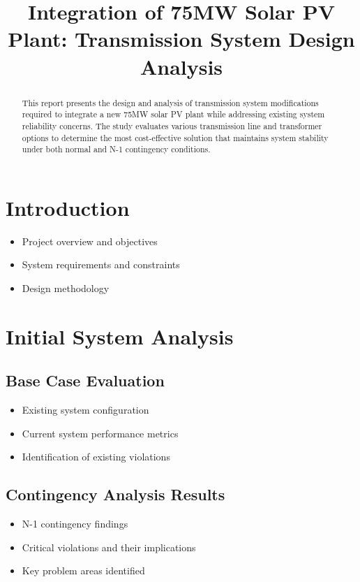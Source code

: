 \documentclass[conference]{IEEEtran}
\begin{document}
	
	\title{Integration of 75MW Solar PV Plant: Transmission System Design Analysis}
	
	\author{
	}
	
	\maketitle
	
	\begin{abstract}
		This report presents the design and analysis of transmission system modifications required to integrate a new 75MW solar PV plant while addressing existing system reliability concerns. The study evaluates various transmission line and transformer options to determine the most cost-effective solution that maintains system stability under both normal and N-1 contingency conditions.
	\end{abstract}
	
	\section{Introduction}
	\begin{itemize}
		\item Project overview and objectives
		\item System requirements and constraints
		\item Design methodology
	\end{itemize}
	
	\section{Initial System Analysis}
	\subsection{Base Case Evaluation}
	\begin{itemize}
		\item Existing system configuration
		\item Current system performance metrics
		\item Identification of existing violations
	\end{itemize}
	
	\subsection{Contingency Analysis Results}
	\begin{itemize}
		\item N-1 contingency findings
		\item Critical violations and their implications
		\item Key problem areas identified
	\end{itemize}
	
\end{document}
